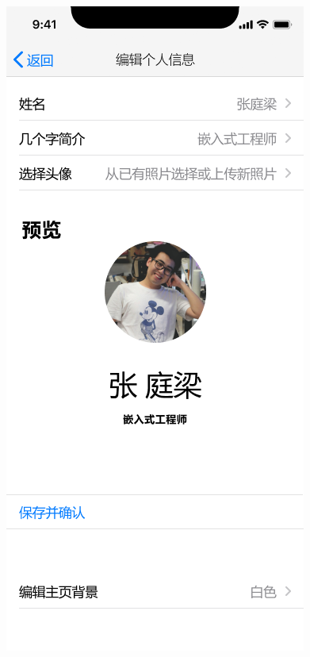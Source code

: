 \documentclass[UTF8]{ctexart}
\begin{document}
\begin{figure}[htbp]
{\begin{minipage}[b]{.3\linewidth}
            \includegraphics[scale=0.3]{EditHomepageProfile.png}
        \end{minipage}
    }
\end{figure}
\end{document}

